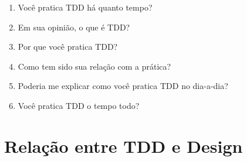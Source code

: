 \begin{enumerate}
	\item Você pratica TDD há quanto tempo?

	\item Em sua opinião, o que é TDD?

	\item Por que você pratica TDD?

	\item Como tem sido sua relação com a prática?

	\item Poderia me explicar como você pratica TDD no dia-a-dia?

	\item Você pratica TDD o tempo todo?
\end{enumerate}

\section{Relação entre TDD e Design}

